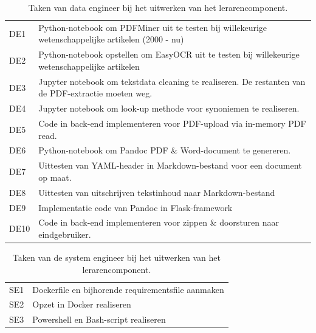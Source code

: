 \begin{center}
	\begin{table}[H]
		\begin{tabular}{|m{2cm}|m{12cm}|}
			\hline
			DE1	& Python-notebook om PDFMiner uit te testen bij willekeurige wetenschappelijke artikelen (2000 - nu) \\
			DE2 & Python-notebook opstellen om EasyOCR uit te testen bij willekeurige wetenschappelijke artikelen \\
			DE3 & Jupyter notebook om tekstdata cleaning te realiseren. De restanten van de PDF-extractie moeten weg. \\
			DE4 & Jupyter notebook om look-up methode voor synoniemen te realiseren. \\
			DE5 & Code in back-end implementeren voor PDF-upload via in-memory PDF read. \\
			DE6 & Python-notebook om Pandoc PDF \& Word-document te genereren. \\
			DE7 & Uittesten van YAML-header in Markdown-bestand voor een document op maat. \\
			DE8 & Uittesten van uitschrijven tekstinhoud naar Markdown-bestand \\
			DE9 & Implementatie code van Pandoc in Flask-framework \\
			DE10 & Code in back-end implementeren voor zippen \& doorsturen naar eindgebruiker. \\
			\hline
		\end{tabular}
			\caption{Taken van data engineer bij het uitwerken van het lerarencomponent.}
			\label{table:tasks-data-engineer}
	\end{table}
\end{center}

\begin{center}
	\begin{table}
		\begin{tabular}{|m{2cm}|m{12cm}|}
			\hline
			SE1 & Dockerfile en bijhorende requirementsfile aanmaken \\
			SE2 & Opzet in Docker realiseren \\
			SE3 & Powershell en Bash-script realiseren \\
			\hline
		\end{tabular}
		\caption{Taken van de system engineer bij het uitwerken van het lerarencomponent.}
		\label{table:tasks-system-engineer}
	\end{table}
\end{center}


